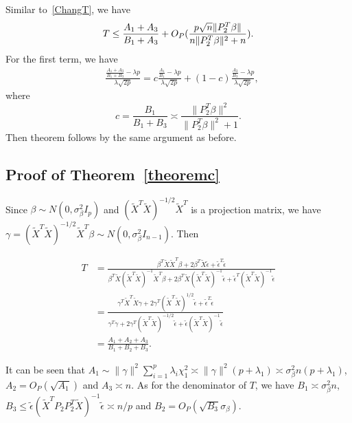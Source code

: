\documentclass[review]{elsarticle}
\theoremstyle{plain}
\theoremstyle{definition}
\theoremstyle{remark}
\begin{document}
Similar to~\eqref{ChangT}, we have
\begin{equation*}
            T\leq\frac{A_1+A_3}{B_1+A_3}+O_P(\frac{p\sqrt{n}\|P_2^T\beta\|}{n\|P_2^T\beta\|^2+n}).\\
\end{equation*}
For the first term, we have
\begin{equation*}
    \begin{aligned}
        &\frac{\frac{A_1+A_3}{B_1+B_3}-\lambda p}{\lambda \sqrt{2p}}
        =c\frac{\frac{A_1}{B_1}-\lambda p}{\lambda \sqrt{2p}}+
        (1-c)\frac{\frac{A_3}{B_3}-\lambda p}{\lambda \sqrt{2p}},
    \end{aligned}
\end{equation*}
where 
\begin{equation*}
    c=\frac{B_1}{B_1+B_3}\asymp \frac{\|P_2^T \beta\|^2}{\|P_2^T \beta\|^2+1}.
\end{equation*}
Then theorem follows by the same argument as before.


\subsection{Proof of Theorem~\ref{theoremc}}

Since $\beta\sim N(0,\sigma^2_{\beta}I_p)$ and ${(\tilde{X}^T \tilde{X})}^{-1/2}\tilde{X}^T$ is a projection matrix, we have $\gamma={(\tilde{X}^T \tilde{X})}^{-1/2}\tilde{X}^T\beta\sim N(0,\sigma^2_{\beta}I_{n-1})$. Then


\begin{equation*}
    \begin{aligned}
        T&=\frac{\beta^T \tilde{X}\tilde{X}^T \beta+
        2\beta^T \tilde{X}\tilde{\epsilon}+
        \tilde{\epsilon}^T\tilde{\epsilon}
    }{\beta^T \tilde{X}{(\tilde{X}^T\tilde{X})}^{-1}\tilde{X}^T \beta+
        2\beta^T \tilde{X}{(\tilde{X}^T\tilde{X})}^{-1}\tilde{\epsilon}+
        \tilde{\epsilon}^T{(\tilde{X}^T\tilde{X})}^{-1}\tilde{\epsilon}
    }\\
        &=\frac{\gamma^T\tilde{X}^T\tilde{X}\gamma+2\gamma^T{(\tilde{X}^T\tilde{X})}^{1/2}\tilde{\epsilon}+\tilde{\epsilon}^T\tilde{\epsilon}}{\gamma^T\gamma+2\gamma^T{(\tilde{X}^T\tilde{X})}^{-1/2}\tilde{\epsilon}+\tilde{\epsilon}{(\tilde{X}^T\tilde{X})}^{-1}\tilde{\epsilon}}\\
        &=\frac{A_1+A_2+A_3}{B_1+B_2+B_3}.
    \end{aligned}
\end{equation*}

It can be seen that
$A_1\sim \|\gamma\|^2\sum_{i=1}^{p}\lambda_i \chi^2_1\asymp \|\gamma\|^2 (p+\lambda_1)\asymp \sigma^2_\beta n(p+\lambda_1)$, $A_2=O_P(\sqrt{A_1})$ and $A_3\asymp n$. As for the denominator of $T$, we have $B_1\asymp \sigma^2_\beta n$, $B_3 \leq \tilde{\epsilon}{(\tilde{X}^T P_2 P_2^T\tilde{X})}^{-1}\tilde{\epsilon}\asymp n/p$ and $B_2=O_P(\sqrt{B_3}\sigma_\beta)$.
\end{document}
